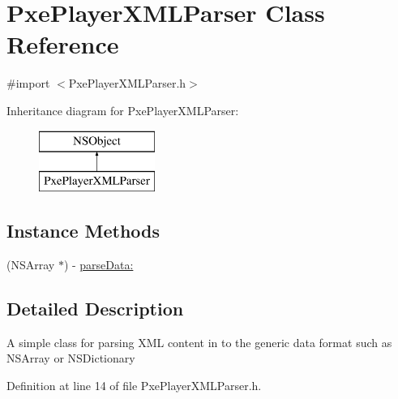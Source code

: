 \hypertarget{interface_pxe_player_x_m_l_parser}{\section{Pxe\-Player\-X\-M\-L\-Parser Class Reference}
\label{interface_pxe_player_x_m_l_parser}
}


{\ttfamily \#import $<$Pxe\-Player\-X\-M\-L\-Parser.\-h$>$}

Inheritance diagram for Pxe\-Player\-X\-M\-L\-Parser\-:\begin{figure}[H]
\begin{center}
\leavevmode
\includegraphics[height=2.000000cm]{interface_pxe_player_x_m_l_parser}
\end{center}
\end{figure}
\subsection*{Instance Methods}
\begin{DoxyCompactItemize}
\item 
(N\-S\-Array $\ast$) -\/ \hyperlink{interface_pxe_player_x_m_l_parser_a2082f89d8d56c1875b734687072b7b9e}{parse\-Data\-:}
\end{DoxyCompactItemize}


\subsection{Detailed Description}
A simple class for parsing X\-M\-L content in to the generic data format such as N\-S\-Array or N\-S\-Dictionary 

Definition at line 14 of file Pxe\-Player\-X\-M\-L\-Parser.\-h.



